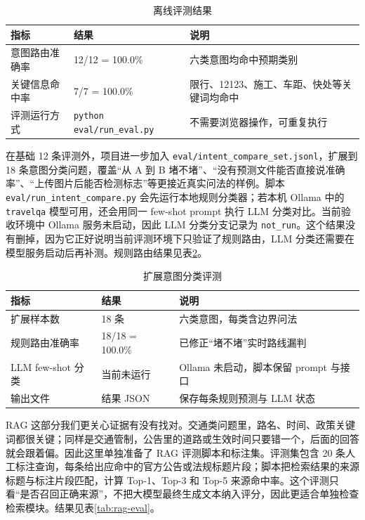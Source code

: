 \documentclass[bwprint]{report}
\begin{document}
\begin{table}[H]
    \caption{离线评测结果}
    \label{tab:offline-eval}
    \centering
    \begin{tabular}{p{}p{}p{}}
        \toprule[1.5pt]
        指标 & 结果 & 说明 \\
        \midrule[1pt]
        意图路由准确率 & 12/12 = 100.0\% & 六类意图均命中预期类别 \\
        关键信息命中率 & 7/7 = 100.0\% & 限行、12123、施工、车距、快处等关键词均命中 \\
        评测运行方式 & \texttt{python eval/run\_eval.py} & 不需要浏览器操作，可重复执行 \\
        \bottomrule[1.5pt]
    \end{tabular}
\end{table}

在基础 12 条评测外，项目进一步加入 \texttt{eval/intent\_compare\_set.jsonl}，扩展到 18 条意图分类问题，覆盖``从 A 到 B 堵不堵''、``没有预测文件能否直接说准确率''、``上传图片后能否检测标志''等更接近真实问法的样例。脚本 \texttt{eval/run\_intent\_compare.py} 会先运行本地规则分类器；若本机 Ollama 中的 \texttt{travelqa} 模型可用，还会用同一 few-shot prompt 执行 LLM 分类对比。当前验收环境中 Ollama 服务未启动，因此 LLM 分类分支记录为 \texttt{not\_run}。这个结果没有删掉，因为它正好说明当前评测环境下只验证了规则路由，LLM 分类还需要在模型服务启动后再补测。规则路由结果见表\ref{tab:intent-extended}。

\begin{table}[H]
    \caption{扩展意图分类评测}
    \label{tab:intent-extended}
    \centering
    \small
    \begin{tabular}{p{}p{}p{}}
        \toprule[1.5pt]
        指标 & 结果 & 说明 \\
        \midrule[1pt]
        扩展样本数 & 18 条 & 六类意图，每类含边界问法 \\
        规则路由准确率 & 18/18 = 100.0\% & 已修正``堵不堵''实时路线漏判 \\
        LLM few-shot 分类 & 当前未运行 & Ollama 未启动，脚本保留 prompt 与接口 \\
        输出文件 & 结果 JSON & 保存每条规则预测与 LLM 状态 \\
        \bottomrule[1.5pt]
    \end{tabular}
\end{table}

RAG 这部分我们更关心证据有没有找对。交通类问题里，路名、时间、政策关键词都很关键；同样是交通管制，公告里的道路或生效时间只要错一个，后面的回答就会跟着偏。因此这里单独准备了 RAG 评测脚本和标注集。评测集包含 20 条人工标注查询，每条给出应命中的官方公告或法规标题片段；脚本把检索结果的来源标题与标注片段匹配，计算 Top-1、Top-3 和 Top-5 来源命中率。这个评测只看``是否召回正确来源''，不把大模型最终生成文本纳入评分，因此更适合单独检查检索模块。结果见表\ref{tab:rag-eval}。
\end{document}
